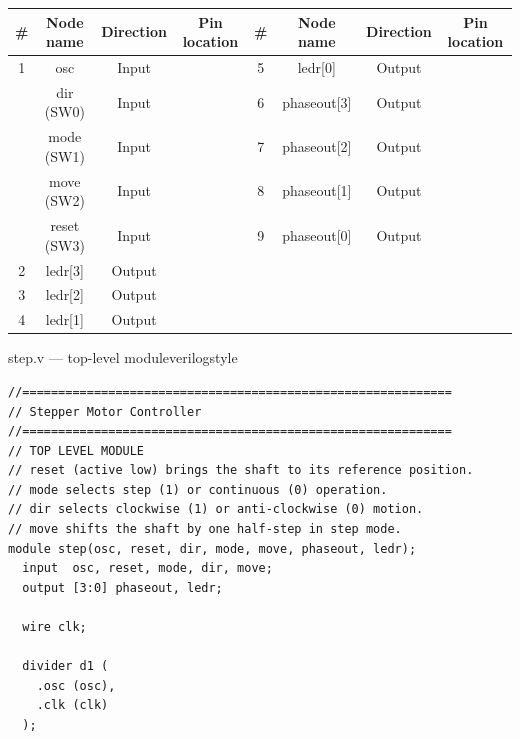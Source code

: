 \begin{procedure}
  \begin{boxedtable}
    \label{tab:exp6-pins}
    {\renewcommand{\arraystretch}{1.5}
      \centering
      \begin{tabular}{cccc|cccc}
        \toprule
        \# & Node name   & Direction & Pin location & \# & Node name   & Direction & Pin location \\
        \midrule
        1  & osc         & Input     &              & 5  & ledr[0]     & Output    &              \\
           & dir (SW0)   & Input     &              & 6  & phaseout[3] & Output    &              \\
           & mode (SW1)  & Input     &              & 7  & phaseout[2] & Output    &              \\
           & move (SW2)  & Input     &              & 8  & phaseout[1] & Output    &              \\
           & reset (SW3) & Input     &              & 9  & phaseout[0] & Output    &              \\
        2  & ledr[3]     & Output    &              &    &             &           &              \\
        3  & ledr[2]     & Output    &              &    &             &           &              \\
        4  & ledr[1]     & Output    &              &    &             &           &              \\
        \bottomrule
      \end{tabular}
    }
  \end{boxedtable}
  \newpage

  \begin{codepanel}{step.v --- top-level module}{verilogstyle}
    \begin{lstlisting}
//============================================================
// Stepper Motor Controller
//============================================================
// TOP LEVEL MODULE
// reset (active low) brings the shaft to its reference position.
// mode selects step (1) or continuous (0) operation.
// dir selects clockwise (1) or anti-clockwise (0) motion.
// move shifts the shaft by one half-step in step mode.
module step(osc, reset, dir, mode, move, phaseout, ledr);
  input  osc, reset, mode, dir, move;
  output [3:0] phaseout, ledr;

  wire clk;

  divider d1 (
    .osc (osc),
    .clk (clk)
  );


\end{lstlisting}
\end{codepanel}
\end{procedure}
